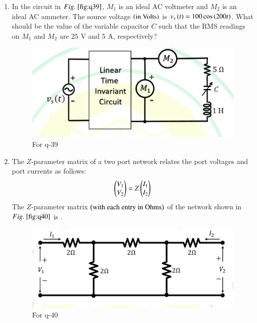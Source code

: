 \documentclass[journal,12pt,onecolumn]{IEEEtran}
\theoremstyle{remark}
\begin{document}
\begin{enumerate}
\item In the circuit in $\figref{fig:q39}$, $M_1$ is an ideal AC voltmeter and $M_2$ is an ideal AC ammeter. The source voltage $\left(\text{in Volts}\right)$ is $v_s\left(t\right) = 100 \cos\left(200t\right)$. What should be the value of the variable capacitor $C$ such that the RMS readings on $M_1$ and $M_2$ are $25$ V and $5$ A, respectively?
\begin{figure}[H]
\centering
\includegraphics[width=0.5\columnwidth]{q39}
\caption{For q-39}
\label{fig:q39}
\end{figure}

\hfill{}

\begin{enumerate}
\end{enumerate}

\item The $Z$-parameter matrix of a two port network relates the port voltages and port currents as follows:
\begin{align*}
  \begin{pmatrix}V_1 \\ V_2\end{pmatrix} = Z \begin{pmatrix}I_1 \\ I_2\end{pmatrix}  
\end{align*}  
The $Z$-parameter matrix $\left(\text{with each entry in Ohms}\right)$ of the network shown in $\figref{fig:q40}$ is \underline{\hspace{2cm}}.
\begin{figure}[H]
\centering
\includegraphics[width=0.6\columnwidth]{q40}
\caption{For q-40}
\label{fig:q40}
\end{figure}


\end{enumerate}
\end{document}
